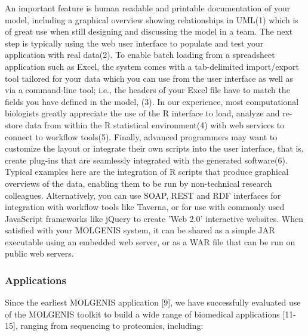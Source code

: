 \documentclass[8pt, twoside, a5paper]{report}
\begin{document}
An important feature is human readable and printable documentation of your model, including a graphical overview showing 
relationships in UML(1) which is of great use when still designing and discussing the model in a team. The next step is 
typically using the web user interface to populate and test your application with real data(2). To enable batch loading 
from a spreadsheet application such as Excel, the system comes with a tab-delimited import/export tool tailored for your 
data which you can use from the user interface as well as via a command-line tool; i.e., the headers of your Excel file 
have to match the fields you have defined in the model, (3). In our experience, most computational biologists greatly 
appreciate the use of the R interface to load, analyze and re-store data from within the R statistical environment(4) with 
web services to connect to workflow tools(5). Finally, advanced programmers may want to customize the layout or integrate 
their own scripts into the user interface, that is, create plug-ins that are seamlessly integrated with the generated 
software(6). Typical examples here are the integration of R scripts that produce graphical overviews of the data, enabling 
them to be run by non-technical research colleagues. Alternatively, you can use SOAP, REST and RDF interfaces for 
integration with workflow tools like Taverna, or for use with commonly used JavaScript frameworks like jQuery to create 
'Web 2.0' interactive websites. When satisfied with your MOLGENIS system, it can be shared as a simple JAR executable 
using an embedded web server, or as a WAR file that can be run on public web servers.

\subsubsection{Applications}

Since the earliest MOLGENIS application [9], we have successfully evaluated use of the MOLGENIS toolkit to build a wide 
range of biomedical applications [11-15], ranging from sequencing to proteomics, including:
\end{document}
